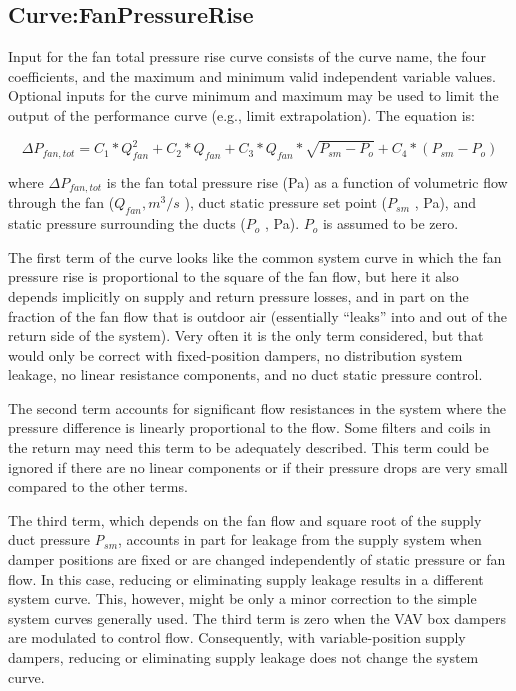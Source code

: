 \subsection{Curve:FanPressureRise}\label{curvefanpressurerise}

Input for the fan total pressure rise curve consists of the curve name, the four coefficients, and the maximum and minimum valid independent variable values. Optional inputs for the curve minimum and maximum may be used to limit the output of the performance curve (e.g., limit extrapolation). The equation is:

\begin{equation}
\Delta {P_{fan,tot}} = {C_1}*Q_{fan}^2 + {C_2}*Q_{fan}^{} + {C_3}*Q_{fan}^{}*\sqrt {{P_{sm}} - {P_o}}  + {C_4}*\left( {{P_{sm}} - {P_o}} \right)
\end{equation}

where \(\Delta P_{fan,tot}\) is the fan total pressure rise (Pa) as a function of volumetric flow through the fan (\(Q_{fan}, m^3/s\) ), duct static pressure set point (\(P_{sm}\) , Pa), and static pressure surrounding the ducts (\(P_o\) , Pa). \(P_o\) is assumed to be zero.

The first term of the curve looks like the common system curve in which the fan pressure rise is proportional to the square of the fan flow, but here it also depends implicitly on supply and return pressure losses, and in part on the fraction of the fan flow that is outdoor air (essentially ``leaks'' into and out of the return side of the system). Very often it is the only term considered, but that would only be correct with fixed-position dampers, no distribution system leakage, no linear resistance components, and no duct static pressure control.

The second term accounts for significant flow resistances in the system where the pressure difference is linearly proportional to the flow. Some filters and coils in the return may need this term to be adequately described. This term could be ignored if there are no linear components or if their pressure drops are very small compared to the other terms.

The third term, which depends on the fan flow and square root of the supply duct pressure \emph{P\(_{sm}\)}, accounts in part for leakage from the supply system when damper positions are fixed or are changed independently of static pressure or fan flow. In this case, reducing or eliminating supply leakage results in a different system curve. This, however, might be only a minor correction to the simple system curves generally used. The third term is zero when the VAV box dampers are modulated to control flow. Consequently, with variable-position supply dampers, reducing or eliminating supply leakage does not change the system curve.


